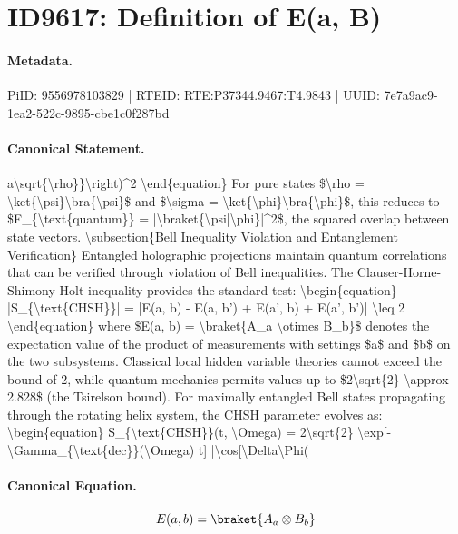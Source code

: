 \section*{ID9617: Definition of E(a, B)}
\paragraph{Metadata.}
PiID: 9556978103829 | RTEID: RTE:P37344.9467:T4.9843 | UUID: 7e7a9ac9-1ea2-522c-9895-cbe1c0f287bd

\paragraph{Canonical Statement.}
a\textbackslash{}sqrt\{\textbackslash{}rho\}\}\textbackslash{}right)\textasciicircum{}2 \textbackslash{}end\{equation\} For pure states \$\textbackslash{}rho = \textbackslash{}ket\{\textbackslash{}psi\}\textbackslash{}bra\{\textbackslash{}psi\}\$ and \$\textbackslash{}sigma = \textbackslash{}ket\{\textbackslash{}phi\}\textbackslash{}bra\{\textbackslash{}phi\}\$, this reduces to \$F\_\{\textbackslash{}text\{quantum\}\} = |\textbackslash{}braket\{\textbackslash{}psi|\textbackslash{}phi\}|\textasciicircum{}2\$, the squared overlap between state vectors. \textbackslash{}subsection\{Bell Inequality Violation and Entanglement Verification\} Entangled holographic projections maintain quantum correlations that can be verified through violation of Bell inequalities. The Clauser-Horne-Shimony-Holt inequality provides the standard test: \textbackslash{}begin\{equation\} |S\_\{\textbackslash{}text\{CHSH\}\}| = |E(a, b) - E(a, b') + E(a', b) + E(a', b')| \textbackslash{}leq 2 \textbackslash{}end\{equation\} where \$E(a, b) = \textbackslash{}braket\{A\_a \textbackslash{}otimes B\_b\}\$ denotes the expectation value of the product of measurements with settings \$a\$ and \$b\$ on the two subsystems. Classical local hidden variable theories cannot exceed the bound of 2, while quantum mechanics permits values up to \$2\textbackslash{}sqrt\{2\} \textbackslash{}approx 2.828\$ (the Tsirelson bound). For maximally entangled Bell states propagating through the rotating helix system, the CHSH parameter evolves as: \textbackslash{}begin\{equation\} S\_\{\textbackslash{}text\{CHSH\}\}(t, \textbackslash{}Omega) = 2\textbackslash{}sqrt\{2\} \textbackslash{}exp[-\textbackslash{}Gamma\_\{\textbackslash{}text\{dec\}\}(\textbackslash{}Omega) t] |\textbackslash{}cos[\textbackslash{}Delta\textbackslash{}Phi(

\paragraph{Canonical Equation.}
\[
E(a, b) = \braket{A_a \otimes B_b}
\]


